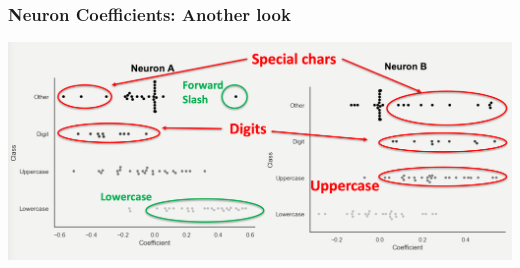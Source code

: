 \begin{frame}
\frametitle{Neuron Coefficients: Another look}
\includegraphics[width=\textwidth]{res/learned-info.png}
\end{frame}